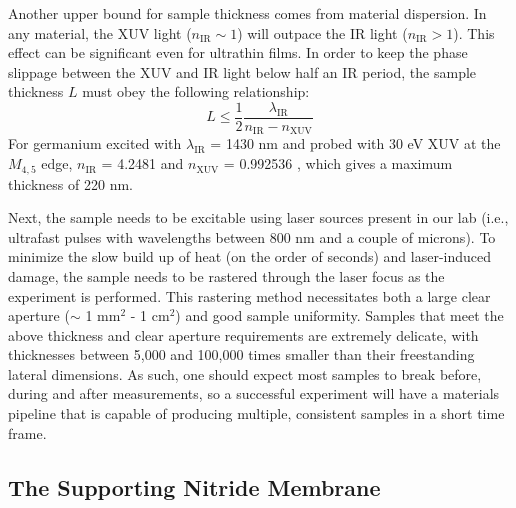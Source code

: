 Another upper bound for sample thickness comes from material dispersion. In any material, the XUV light ($n_{\text{IR}} \sim 1$) will outpace the IR light ($n_{\text{IR}} > 1$). This effect can be significant even for ultrathin films. In order to keep the phase slippage between the XUV and IR light below half an IR period, the sample thickness $L$ must obey the following relationship:
\begin{equation}
L \le \frac{1}{2} \frac{\lambda_{\text{IR}}}{n_{\text{IR}} - n_{\text{XUV}}}
\end{equation}
For germanium excited with $\lambda_{\text{IR}}$ = 1430 nm and probed with 30 eV XUV at the $M_{4,5}$ edge, $n_{\text{IR}}$ = 4.2481 \cite{nunleyOpticalConstantsGermanium2016} and $n_{\text{XUV}}$ = 0.992536 \cite{gulliksonCXROXRayInteractions}, which gives a maximum thickness of 220 nm.

Next, the sample needs to be excitable using laser sources present in our lab (i.e., ultrafast pulses with wavelengths between 800 nm and a couple of microns). To minimize the slow build up of heat (on the order of seconds) and laser-induced damage, the sample needs to be rastered through the laser focus as the experiment is performed. This rastering method necessitates both a large clear aperture ($\sim$ 1 mm$^2$ - 1 cm$^2$) and good sample uniformity. Samples that meet the above thickness and clear aperture requirements are extremely delicate, with thicknesses between 5,000 and 100,000 times smaller than their freestanding lateral dimensions. As such, one should expect most samples to break before, during and after measurements, so a successful experiment will have a materials pipeline that is capable of producing multiple, consistent samples in a short time frame.

\subsection{The Supporting Nitride Membrane}

